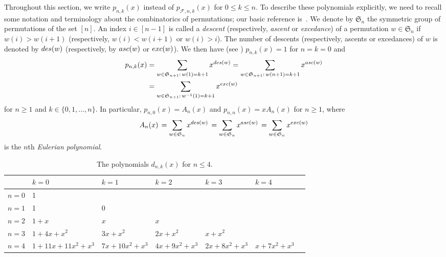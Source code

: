 \documentclass[11pt]{amsart}
\newcommand{\asc}{{\rm asc}}
\newcommand{\des}{{\rm des}}
\newcommand{\exc}{{\rm exc}}
\newcommand{\fF}{{\mathcal F}}
\newcommand{\fS}{{\mathfrak S}}
\begin{document}
Throughout this section, we write $p_{n,k}(x)$ 
instead of $p_{\fF,n,k}(x)$ for $0 \le k \le n$. 
To describe these polynomials explicitly, we need to
recall some notation and terminology about the 
combinatorics of permutations; our basic reference 
is~\cite{StaEC1}. We denote by $\fS_n$ the symmetric 
group of permutations of the set $[n]$. An index
$i \in [n-1]$ is called a \emph{descent} 
(respectively, \emph{ascent} or \emph{excedance}) of 
a permutation $w \in \fS_n$ if $w(i) > w(i+1)$ 
(respectively, $w(i) < w(i+1)$ or $w(i) > i$). The 
number of descents (respectively, ascents or
excedances) of $w$ is denoted by $\des(w)$ 
(respectively, by $\asc(w)$ or $\exc(w)$). We then 
have (see \cite[Example~3.8]{Ath23+}) 
$p_{n,k}(x) = 1$ for $n=k=0$ and 
%
\begin{align} 
p_{n,k}(x) & = \sum_{w \in \fS_{n+1} : \, w(1) = k+1} 
                  x^{\des(w)} = 
							 \sum_{w \in \fS_{n+1} : \, w(n+1) = k+1} 
                  x^{\asc(w)} 	\label{eq:pnk-1} \\
           & = \sum_{w \in \fS_{n+1}: \, w^{-1}(1) = 
					           k+1} x^{\exc(w)} \label{eq:pnk-2}
\end{align}
%
for $n \ge 1$ and $k \in \{0, 1,\dots,n\}$. In 
particular, $p_{n,0}(x) = A_n(x)$ and $p_{n,n}(x) 
= xA_n(x)$ for $n \ge 1$, where  
%
\[ A_n(x) \, = \sum_{w \in \fS_n} x^{\des(w)} 
          \, = \sum_{w \in \fS_n} x^{\asc(w)} 
					\, = \sum_{w \in \fS_n} x^{\exc(w)} \]
%
is the $n$th \emph{Eulerian polynomial}.

{\scriptsize
\begin{table}[hptb]
\begin{center}
\begin{tabular}{| l || l | l | l | l | l | l ||} 
       \hline
& $k=0$ & $k=1$ & $k=2$ & $k=3$ & $k=4$ \\ \hline 
          \hline
$n=0$  & 1 &  & & & \\ \hline
$n=1$  & 1 & 0 & & & \\ \hline
$n=2$  & $1+x$ & $x$ & $x$ & & \\ \hline
$n=3$  & $1+4x+x^2$ & $3x+x^2$ & $2x+x^2$ & $x+x^2$ 
       & \\ \hline
$n=4$  & $1+11x+11x^2+x^3$ & $7x+10x^2+x^3$ & 
         $4x+9x^2+x^3$ & $2x+8x^2+x^3$ & $x+7x^2+x^3$ 
			 \\ \hline
\end{tabular}

\bigskip
\caption{The polynomials $d_{n,k}(x)$ for $n \le 4$.}
\label{tab:dnk}
\end{center}
\end{table}}
\end{document}
